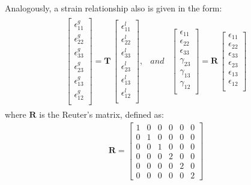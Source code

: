 \documentclass[materials,article,submit,moreauthors,pdftex]{Definitions/mdpi}
\begin{document}
Analogously, a strain relationship also is given in the form:
\begin{eqnarray}
\begin{array}{ccc}
\left [
\begin{array}{c}
\epsilon^g_{11}\\
\epsilon^g_{22}\\ 
\epsilon^g_{33}\\ 
\epsilon^g_{23}\\
\epsilon^g_{13}\\
\epsilon^g_{12}\\
\end{array}
\right ]=
\textbf{T}\,\left [
\begin{array}{c}
\epsilon^l_{11}\\
\epsilon^l_{22}\\ 
\epsilon^l_{33}\\
\epsilon^l_{23}\\
\epsilon^l_{13}\\
\epsilon^l_{12}\\
\end{array}
\right ], & and & \left [
\begin{array}{c}
\epsilon_{11}\\
\epsilon_{22}\\ 
\epsilon_{33}\\ 
\gamma_{23}\\
\gamma_{13}\\
\gamma_{12}\\
\end{array}
\right ]=
\textbf{R}\,\left [
\begin{array}{c}
\epsilon_{11}\\
\epsilon_{22}\\ 
\epsilon_{33}\\
\epsilon_{23}\\
\epsilon_{13}\\
\epsilon_{12}\\
\end{array}
\right ]
\end{array}
\label{eq:strain}
\end{eqnarray}
where \(\textbf{R}\) is the Reuter's matrix, defined as:
\begin{eqnarray}
\textbf{R} = \left [
\begin{array}{cccccc}
1 & 0 & 0 & 0 & 0 & 0\\
0 & 1 & 0 & 0 & 0 & 0\\
0 & 0  & 1 & 0 & 0 & 0\\
0 & 0 & 0 & 2 & 0 & 0\\
0 & 0 & 0 & 0 & 2 & 0\\
0 & 0 & 0 & 0 & 0 & 2
\end{array}
\right ]
\label{eq:reuters}
\end{eqnarray}
\end{document}
